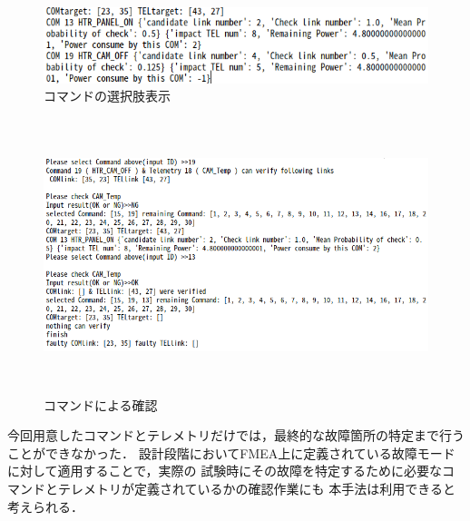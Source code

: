 \documentclass[11pt]{article}
\begin{document}
\begin{figure}[H]
   \centering
      \includegraphics[width=12.0cm]{figure/COM_candidate.png}
      \caption{コマンドの選択肢表示}
      \label{fig:COM_candidate}
\end{figure}
\begin{figure}[H]
   \centering
      \includegraphics[height=8.0cm]{figure/COM_phase.png}
      \caption{コマンドによる確認}
      \label{fig:COM_phase}
\end{figure}

今回用意したコマンドとテレメトリだけでは，最終的な故障箇所の特定まで行うことができなかった．
設計段階においてFMEA上に定義されている故障モードに対して適用することで，実際の
試験時にその故障を特定するために必要なコマンドとテレメトリが定義されているかの確認作業にも
本手法は利用できると考えられる．
\end{document}
